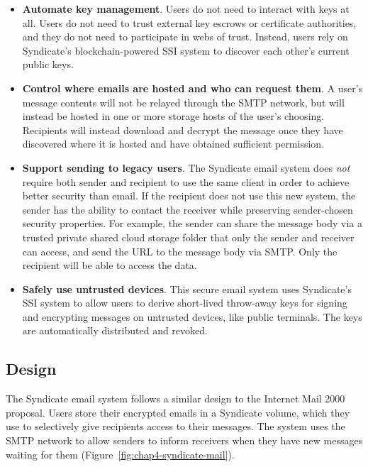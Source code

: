 \begin{itemize}
\item \textbf{Automate key management}.  Users do not need to interact with keys
at all.  Users do not need to trust external key escrows or certificate
authorities, and they do not need to participate in webs of trust.  Instead,
users rely on Syndicate's blockchain-powered SSI system to discover each other's
current public keys.

\item \textbf{Control where emails are hosted and who can request them}.
A user's message contents will
not be relayed through the SMTP network, but will instead be hosted in one or
more storage hosts of the user's choosing.  Recipients will instead download and
decrypt the message once they have discovered where it is hosted and have
obtained sufficient permission.

\item \textbf{Support sending to legacy users}.  The Syndicate email system does \emph{not}
require both sender and recipient to use the same client in order to achieve
better security than email.  If the recipient does not use this new system, the sender has
the ability to contact the receiver while
preserving sender-chosen security properties.  For example, 
the sender can share the message body via a trusted private shared cloud storage folder
that only the sender and receiver can access, and send the URL to the message
body via SMTP.  Only the recipient will be able to access the data.

\item \textbf{Safely use untrusted devices}.  This secure email system uses Syndicate's SSI system to
allow users to derive short-lived throw-away keys for signing and encrypting
messages on untrusted devices, like public terminals.  The keys are
automatically distributed and revoked.
\end{itemize}

\subsection{Design}

The Syndicate email system follows a similar design to the Internet Mail
2000~\cite{internet-mail-2000} proposal.  Users store their
encrypted emails in a Syndicate volume, which they
use to selectively give recipients access to their messages.  The system uses
the SMTP network to allow senders to inform receivers when they have new
messages waiting for them (Figure~\ref{fig:chap4-syndicate-mail}).

